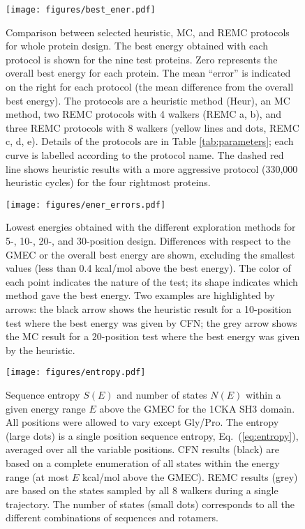 \documentclass[a4paper,12pt]{article}
\begin{document}
\begin{figure}[!h]
\texttt{[image: figures/best\_ener.pdf]}
\caption{\small 
Comparison between selected heuristic, MC, and REMC protocols for whole protein design.
The best energy obtained with each protocol is shown for the nine test proteins. Zero represents
the overall best energy for each protein. The mean ``error'' is indicated on the right for each protocol
(the mean difference from the overall best energy). The protocols are a heuristic method (Heur), an MC
method, two REMC protocols with 4 walkers (REMC a, b), and three REMC protocols with 8 walkers (yellow
lines and dots, REMC c, d, e). Details of the protocols are in Table \ref{tab:parameters}; each curve
is labelled according to the protocol name. The dashed red line shows heuristic results with a more
aggressive protocol (330,000 heuristic cycles) for the four rightmost proteins.
}
\end{figure}


\begin{figure}[!h]
\texttt{[image: figures/ener\_errors.pdf]}
\caption[width=1cm]{\small 
Lowest energies obtained with the different exploration methods for 5-, 10-, 20-, and 30-position design. Differences
with respect to the GMEC or the overall best energy are shown, excluding the smallest values (less than 0.4 kcal/mol
above the best energy). The color of each point indicates the nature of the test; its shape indicates which method
gave the best energy. Two examples are highlighted by arrows: the black arrow shows the heuristic result for a
10-position test where the best energy was given by CFN; the grey arrow shows the MC result for a 20-position test
where the best energy was given by the heuristic.
}
\end{figure}


\begin{figure}[!h]
\texttt{[image: figures/entropy.pdf]}
\caption[width=1cm]{\small 
Sequence entropy $S(E)$ and number of states $N(E)$ within a given energy range $E$ above the GMEC for the 1CKA
SH3 domain. All positions were allowed to vary except Gly/Pro. The entropy (large dots) is a single position
sequence entropy, Eq.\ (\ref{eq:entropy}), averaged over all the variable positions. CFN results (black) are based
on a complete enumeration of all states within the energy range (at most $E$ kcal/mol above the GMEC). REMC results
(grey) are based on the states sampled by all 8 walkers during a single trajectory. The number of states (small dots)
corresponds to all the different combinations of sequences and rotamers.
}
\end{figure}
\end{document}

